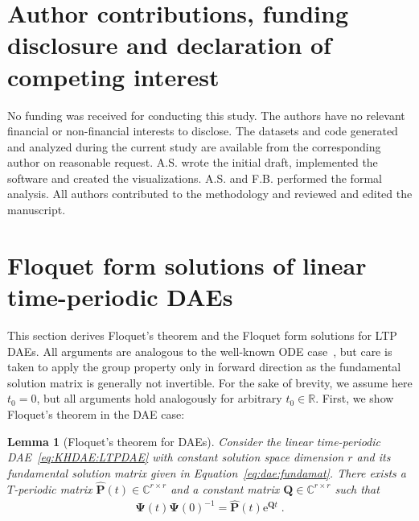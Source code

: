 \documentclass[a4paper, nonatbib, 3p, twocolumn]{elsarticle}
\theoremstyle{plain}
\newtheorem{lemma}[theorem]{Lemma}
\theoremstyle{definition}
\theoremstyle{remark}
\newcommand{\ex}{\re} %
\newcommand{\Rspace}{\mathbb{R}}
\newcommand{\Cspace}{\mathbb{C}}
\newcommand{\re}{\mathrm e}
\newcommand{\vPs}{\mathbf \Psi}
\newcommand{\vP}{\mathbf P}
\newcommand{\vQ}{\mathbf Q}
\begin{document}
\section*{Author contributions, funding disclosure and declaration of competing interest}
No funding was received for conducting this study. The authors have no relevant financial or non-financial interests to disclose. The datasets and code generated and analyzed during the current study are available from the corresponding author on reasonable request. A.S. wrote the initial draft, implemented the software and created the visualizations. A.S. and F.B. performed the formal analysis. All authors contributed to the methodology and reviewed and edited the manuscript. 

\appendix
\section{Floquet form solutions of linear time-periodic DAEs} \label{sec:floquetform}
This section derives Floquet's theorem and the Floquet form solutions for LTP DAEs. All arguments are analogous to the well-known ODE case~\cite{Nayfeh1995}, but care is taken to apply the group property only in forward direction as the fundamental solution matrix is generally not invertible. For the sake of brevity, we assume here $t_0 = 0$, but all arguments hold analogously for arbitrary $t_0 \in \Rspace$.
First, we show Floquet's theorem in the DAE case:

\begin{lemma}[Floquet's theorem for DAEs]\label{eq:Floquetproof:Floquettheorem}
    Consider the linear time-periodic DAE~\eqref{eq:KHDAE:LTPDAE} with constant solution space dimension $r$ and its fundamental solution matrix given in Equation~\eqref{eq:dae:fundamat}. There exists a $T$-periodic matrix $\hat{\vP}(t) \in \Cspace^{r \times r}$ and a constant matrix $\vQ \in \Cspace^{r \times r}$ such that
    \begin{align}
        \vPs(t) \vPs(0)^{-1} = \hat{\vP}(t) \ex^{\vQ t} \;.
    \end{align}
\end{lemma}
\end{document}
